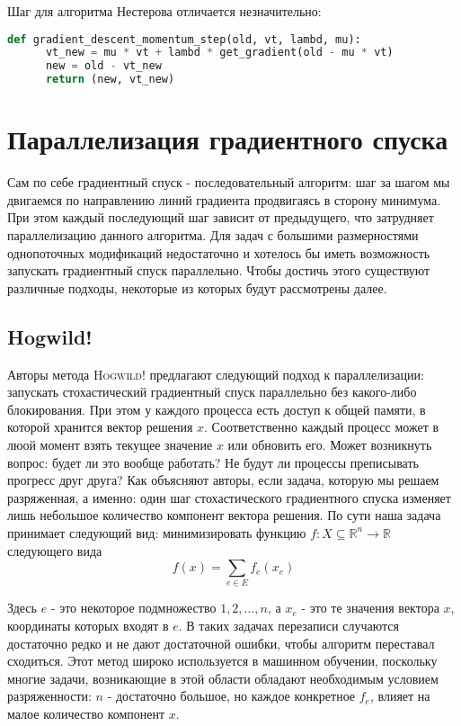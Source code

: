 \documentclass[12pt]{report}
\begin{document}
	Шаг для алгоритма Нестерова отличается незначительно:

  \begin{lstlisting}[language=Python, frame=single]
    def gradient_descent_momentum_step(old, vt, lambd, mu):
      vt_new = mu * vt + lambd * get_gradient(old - mu * vt)
      new = old - vt_new
      return (new, vt_new)
  \end{lstlisting}

  \chapter{Параллелизация градиентного спуска}
  Сам по себе градиентный спуск - последовательный алгоритм: шаг за шагом мы
  двигаемся по направлению линий градиента продвигаясь в сторону минимума.
  При этом каждый последующий шаг зависит от предыдущего, что затрудняет
  параллелизацию данного алгоритма. Для задач с большими размерностями
  однопоточных модификаций недостаточно и хотелось бы иметь возможность запускать
  градиентный спуск параллельно. Чтобы достичь этого существуют различные подходы,
  некоторые из которых будут рассмотрены далее.

  \section{Hogwild!}
  Авторы метода \textsc{Hogwild!} предлагают следующий подход к параллелизации:
  запускать стохастический градиентный спуск параллельно без какого-либо
  блокирования. При этом у каждого процесса есть доступ к общей памяти, в которой
  хранится вектор решения $x$. Соответственно каждый процесс может в люой момент
  взять текущее значение $x$ или обновить его. Может возникнуть вопрос: будет ли
  это вообще работать? Не будут ли процессы преписывать прогресс друг друга?
  Как объясняют авторы, если задача, которую мы решаем разряженная, а именно:
  один шаг стохастического градиентного спуска изменяет лишь небольшое количество
  компонент вектора решения. По сути наша задача принимает следующий вид: минимизировать
  функцию $f: X \subseteq \mathbb{R}^n \to \mathbb{R}$ следующего вида
  \begin{equation}
    f(x) = \sum_{e \in E} f_e(x_e)
  \end{equation}

  Здесь $e$ - это некоторое подмножество ${1,2,\ldots ,n}$, а $x_e$ - это те значения
  вектора $x$, координаты которых входят в $e$. В таких задачах перезаписи
  случаются достаточно редко и не дают достаточной ошибки, чтобы алгоритм переставал
  сходиться. Этот метод широко используется в машинном обучении, поскольку многие
  задачи, возникающие в этой области обладают необходимым условием разряженности:
  $n$ - достаточно большое, но каждое конкретное $f_e$, влияет на малое количество
  компонент $x$.
\end{document}
